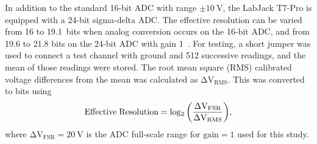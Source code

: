 



In addition to the standard 16-bit ADC with range $\pm10~\mathrm{V}$, the LabJack T7-Pro is equipped with a 24-bit sigma-delta ADC. The effective resolution can be varied from 16 to 19.1~bits when analog conversion occurs on the 16-bit ADC, and from 19.6 to 21.8 bits on the 24-bit ADC with gain 1~\cite{T7}. For testing, a short jumper was used to connect a test channel with ground and 512 successive readings, and the mean of those readings were stored. The root mean square (RMS) calibrated voltage differences from the mean was calculated as $\mathrm{\Delta V_{RMS}}$. This was converted to bits using
\begin{equation}
    \mathrm{Effective\;Resolution=log_2\left(\frac{\Delta V_{FSR}}{\Delta V_{RMS}}\right)}{\rm ,}
\end{equation}
where $\mathrm{\Delta V_{FSR}=20~V}$ is the ADC full-scale range for $\mathrm{gain=1}$ used for this study.

